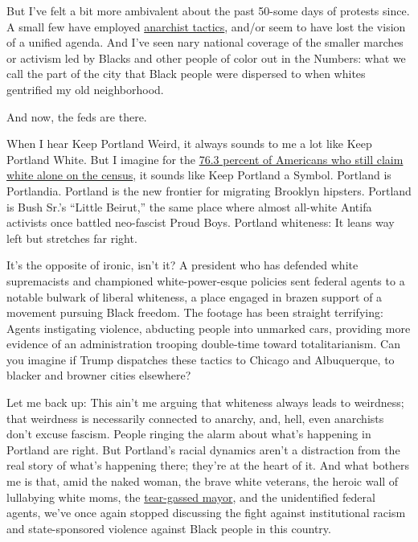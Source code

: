 But I've felt a bit more ambivalent about the past 50-some days of
protests since. A small few have employed
\href{https://abcnews.go.com/US/wireStory/portland-oregon-protest-turns-violent-arrested-71594643}{anarchist
tactics}, and/or seem to have lost the vision of a unified agenda. And
I've seen nary national coverage of the smaller marches or activism led
by Blacks and other people of color out in the Numbers: what we call the
part of the city that Black people were dispersed to when whites
gentrified my old neighborhood.

And now, the feds are there.

When I hear Keep Portland Weird, it always sounds to me a lot like Keep
Portland White. But I imagine for the
\href{https://www.census.gov/quickfacts/fact/table/US/PST045219}{76.3
percent of Americans who still claim white alone on the census}, it
sounds like Keep Portland a Symbol. Portland is Portlandia. Portland is
the new frontier for migrating Brooklyn hipsters. Portland is Bush Sr.'s
``Little Beirut,'' the same place where almost all-white Antifa
activists once battled neo-fascist Proud Boys. Portland whiteness: It
leans way left but stretches far right.

It's the opposite of ironic, isn't it? A president who has defended
white supremacists and championed white-power-esque policies sent
federal agents to a notable bulwark of liberal whiteness, a place
engaged in brazen support of a movement pursuing Black freedom. The
footage has been straight terrifying: Agents instigating violence,
abducting people into unmarked cars, providing more evidence of an
administration trooping double-time toward totalitarianism. Can you
imagine if Trump dispatches these tactics to Chicago and Albuquerque, to
blacker and browner cities elsewhere?

Let me back up: This ain't me arguing that whiteness always leads to
weirdness; that weirdness is necessarily connected to anarchy, and,
hell, even anarchists don't excuse fascism. People ringing the alarm
about what's happening in Portland are right. But Portland's racial
dynamics aren't a distraction from the real story of what's happening
there; they're at the heart of it. And what bothers me is that, amid the
naked woman, the brave white veterans, the heroic wall of lullabying
white moms, the
\href{https://www.nytimes3xbfgragh.onion/2020/07/23/us/portland-protest-tear-gas-mayor.html}{tear-gassed
mayor}, and the unidentified federal agents, we've once again stopped
discussing the fight against institutional racism and state-sponsored
violence against Black people in this country.

